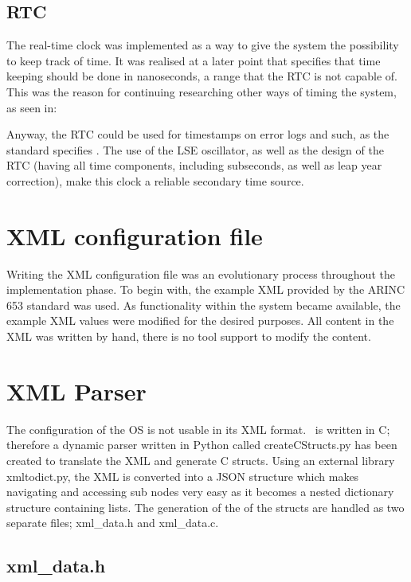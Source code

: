 \subsection{RTC}
The real-time clock was implemented as a way to give the system the
possibility to keep track of time. It was realised at a later point
that \arinc{} specifies that time keeping should be done in nanoseconds,
a range that the RTC is not capable of. This was the reason for continuing 
researching other ways of timing the system, as seen in:

Anyway, the RTC could be used for timestamps on error logs and such,
as the standard specifies \cite{arinc_page_26}. The use of the LSE oscillator,
as well as the design of the RTC (having all time components, including
subseconds, as well as leap year correction), make this clock a reliable
secondary time source.

\section{XML configuration file}

Writing the XML configuration file was an evolutionary process throughout the implementation phase. To begin with, the example XML provided by the ARINC 653 standard was used. As functionality within the system became available, the example XML values were modified for the desired purposes. All content in the XML was written by hand, there is no tool support to modify the content.

\section{XML Parser}

The configuration of the OS is not usable in its XML format. \OSname\ is written in C; therefore a dynamic parser written in Python called createCStructs.py has been created to translate the XML and generate C structs.
Using an external library xmltodict.py, the XML is converted into a JSON structure which makes navigating and accessing sub nodes very easy as it becomes a nested dictionary structure containing lists.
The generation of the of the structs are handled as two separate files; xml\_data.h and xml\_data.c. 

\subsection{xml\_data.h}

